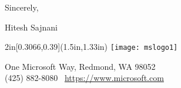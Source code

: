 \documentclass{article}
\begin{document}

\bigskip

Sincerely,
\vspace{4\baselineskip}

Hitesh Sajnani \\



\begin{textblock*}{2in}[0.3066,0.39](1.5in,1.33in)
    \texttt{[image: mslogo1]}
\end{textblock*}

\vfill
{\footnotesize\color{WSUgray}\sffamily
One Microsoft Way, Redmond, WA 98052\\[-0.1\baselineskip]
(425) 882-8080  \textbullet\ \url{https://www.microsoft.com}
}
\end{document}
